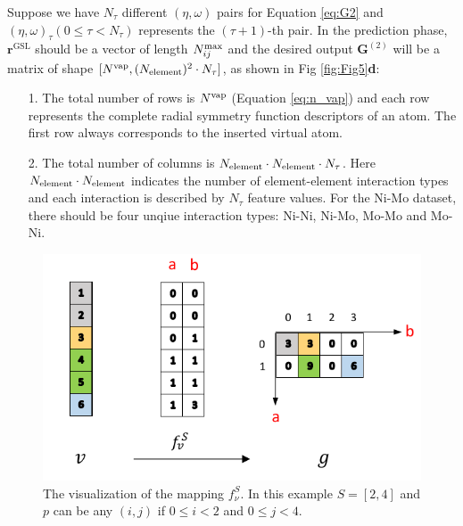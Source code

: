 \documentclass[final,1p,times]{elsarticle}
\begin{document}
Suppose we have $N_{\tau}$ different $(\eta, \omega)$ pairs for Equation 
\ref{eq:G2} and $(\eta, \omega)_{\tau} (0 \le \tau < N_{\tau})$ represents the 
$(\tau+1)$-th pair. In the prediction phase, $\mathbf{r}^{\mathrm{GSL}}$ should 
be a vector of length $N_{ij}^{\mathrm{max}}$ and the desired output $\mathbf{G}^{(2)}$ will 
be a matrix of shape $[N^{\mathrm{vap}}, (N_{\mathrm{element}})^2 \cdot N_{\tau}]$, as shown in 
Fig \ref{fig:Fig5}\textbf{d}:
\begin{itemize}
    
    \item[1.] 
    The total number of rows is $N^{\mathrm{vap}}$ (Equation \ref{eq:n_vap}) and each row
    represents the complete radial symmetry function descriptors of an atom. The 
    first row always corresponds to the inserted virtual atom.
    
    \item[2.]
    The total number of columns is $N_{\mathrm{element}} \cdot N_{\mathrm{element}} \cdot N_{\tau}$. Here 
    $N_{\mathrm{element}} \cdot N_{\mathrm{element}}$ indicates the number of element-element interaction types 
    and each interaction is described by $N_{\tau}$ feature values. For the 
    Ni-Mo dataset, there should be four unqiue interaction types: Ni-Ni, Ni-Mo, 
    Mo-Mo and Mo-Ni.

\end{itemize}

% 
%
\begin{figure}[h!]
\centering
\includegraphics[scale=1.0]{figures/Fig4.pdf}
\caption{\label{fig:Fig4} The visualization of the mapping $f^S_{\nu}$.
In this example $S = [2,4]$ and $p$ can be any $(i,j)$ if 
$0 \le i < 2$ and $0 \le j < 4$.
}
\end{figure}
\end{document}

